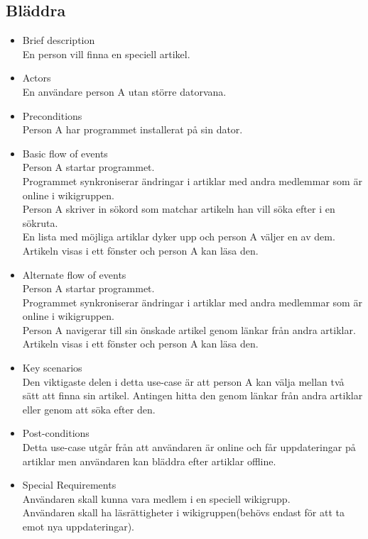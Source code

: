 \subsection{Bläddra}
\begin{itemize}
	\item Brief description
	\\En person vill finna en speciell artikel.
	\item Actors
	\\En användare person A utan större datorvana.
	\item Preconditions
	\\Person A har programmet installerat på sin dator.
	\item Basic flow of events
	\\Person A startar programmet.
	\\Programmet synkroniserar ändringar i artiklar med andra medlemmar som är online i wikigruppen.
	\\Person A skriver in sökord som matchar artikeln han vill söka efter i en sökruta.
	\\En lista med möjliga artiklar dyker upp och person A väljer en av dem.
	\\Artikeln visas i ett fönster och person A kan läsa den.
	\item Alternate flow of events
	\\Person A startar programmet.
	\\Programmet synkroniserar ändringar i artiklar med andra medlemmar som är online i wikigruppen.
	\\Person A navigerar till sin önskade artikel genom länkar från andra artiklar.	
	\\Artikeln visas i ett fönster och person A kan läsa den.
	\item Key scenarios
	\\Den viktigaste delen i detta use-case är att person A kan välja mellan två sätt att finna sin artikel. Antingen hitta den genom länkar från andra artiklar eller genom att söka efter den.
	\item Post-conditions
	\\Detta use-case utgår från att användaren är online och får uppdateringar på artiklar men användaren kan bläddra efter artiklar offline.
	\item Special Requirements
	\\Användaren skall kunna vara medlem i en speciell wikigrupp.
	\\Användaren skall ha läsrättigheter i wikigruppen(behövs endast för att ta emot nya uppdateringar).
\end{itemize}

